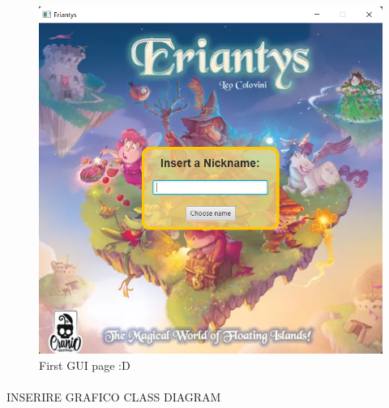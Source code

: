 \documentclass[a4paper, 12pt]{article}
\begin{document}
\begin{itemize}
\begin{figure}[h!]
			\centering
			\includegraphics[scale=0.45]{first_GUI_page.png}
			\caption{First GUI page :D}
		\end{figure}
	\end{itemize}
	\paragraph{}
	INSERIRE GRAFICO CLASS DIAGRAM
	\newpage
\end{document}
